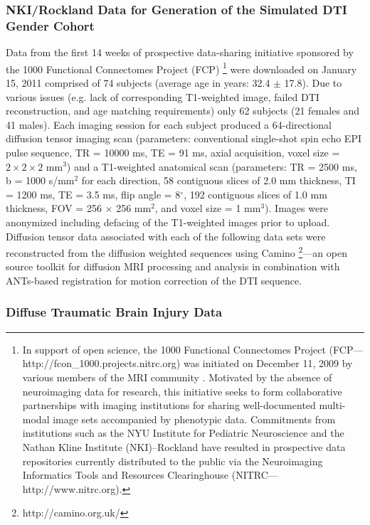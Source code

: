 \documentclass[final,5p,times,twocolumn]{elsarticle}
\begin{document}
\subsubsection{NKI/Rockland Data for Generation of the Simulated DTI Gender Cohort}
Data from the first 14 weeks of prospective data-sharing initiative sponsored by the 1000 Functional Connectomes Project (FCP)%
\footnote{
In support of open science, the 1000 Functional Connectomes Project (FCP---http://fcon\_1000.projects.nitrc.org) 
was initiated on December 11, 2009 by various members of the MRI community \citep{Biswal2010}.  Motivated by the absence of neuroimaging data for research, this initiative seeks to form collaborative partnerships with imaging institutions for sharing well-documented multi-modal image sets accompanied by phenotypic data.  Commitments from institutions such as the NYU Institute for Pediatric Neuroscience and the Nathan Kline Institute (NKI)--Rockland have resulted in prospective data repositories
currently distributed to the public via the Neuroimaging Informatics Tools and Resources Clearinghouse (NITRC---http://www.nitrc.org).
}
were downloaded on January 15, 2011 comprised of 74 subjects (average age in years: 32.4 $\pm$ 17.8).  
Due to various issues (e.g. lack of corresponding T1-weighted image, failed DTI reconstruction, and age matching requirements) only 62 subjects (21 females and 41 males).  Each imaging session for each subject produced a 64-directional diffusion tensor imaging scan (parameters: conventional single-shot spin echo
EPI pulse sequence, TR = 10000 ms, TE = 91 ms, axial acquisition, 
voxel size = $2 \times 2 \times 2$ mm$^3$) and a T1-weighted anatomical scan (parameters:  TR = 2500 ms, b = 1000 s/mm$^2$ for each direction, 58 contiguous slices of 2.0 mm thickness,
TI = 1200 ms, TE = 3.5 ms, flip angle = 8$^\circ$, 192 contiguous slices of 
1.0 mm thickness, FOV = 256 $\times$ 256 mm$^2$, and voxel size = 1 mm$^3$).  Images were anonymized including defacing of the T1-weighted images prior to upload. Diffusion tensor data associated with each of the following data sets were reconstructed from the diffusion weighted sequences using Camino%
\footnote{
http://camino.org.uk/
}---an open source toolkit for diffusion MRI processing and 
analysis \citep{Cook2006} in combination with ANTs-based 
registration for motion correction of the DTI sequence.


\subsubsection{Diffuse Traumatic Brain Injury Data}
\end{document}
